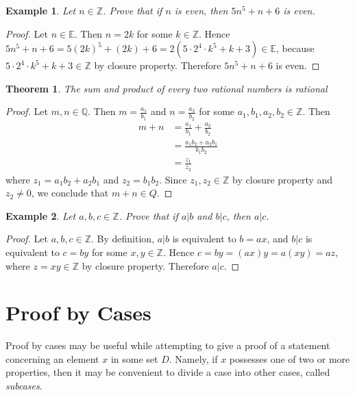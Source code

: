 \documentclass[10pt,reqno]{book}
\theoremstyle{plain}
\newtheorem{theorem}{Theorem}[section]
\newtheorem{example}{Example}
\def\Z{\mathbb{Z}}
\def\Q{\mathbb{Q}}
\def\E{\mathbb{E}}
\begin{document}
	\begin{example}
		Let $ n \in \Z $. Prove that if $ n $ is even, then $ 5n^5 + n + 6 $ is even.
	\end{example}
	
	\begin{proof}
		Let $ n \in \E $. Then $ n = 2k $ for some $ k \in \Z $. Hence $ 5n^5 + n + 6 = 5(2k)^5 + (2k) + 6 = 2(5 \cdot 2^4 \cdot k^5 + k + 3) \in \E $, because $ 5 \cdot 2^4 \cdot k^5 + k + 3 \in \Z $ by closure property. Therefore $ 5n^5 + n + 6 $ is even.
	\end{proof}
	
	\begin{theorem}
		The sum and product of every two rational numbers is rational
	\end{theorem}
	
	\begin{proof}
		Let $ m,n \in \Q $. Then $ m = \frac{a_1}{b_1} $ and $ n = \frac{a_2}{b_2} $ for some $ a_1,b_1,a_2,b_2 \in \Z $. Then
			\begin{align*}
				m + n &= \frac{a_1}{b_1} + \frac{a_2}{b_2}\\
					  &= \frac{a_1 b_2 + a_2 b_1}{b_1 b_2}\\
					  &= \frac{z_1}{z_2}
			\end{align*}
		where $ z_1 = a_1 b_2 + a_2 b_1 $ and $ z_2 = b_1 b_2 $. Since $ z_1, z_2 \in \Z $ by closure property and $ z_2 \neq 0 $, we conclude that $ m + n \in Q $.
	\end{proof}
	
	\begin{example}
		Let $ a,b,c \in \Z $. Prove that if $ a|b $ and $ b|c $, then $ a|c $.
	\end{example}
	
	\begin{proof}
		Let $ a,b,c \in \Z $. By definition, $ a|b $ is equivalent to $ b = ax $, and $ b|c $ is equivalent to $ c = by $ for some $ x,y \in \Z $. Hence $ c = by = (ax) y = a(xy) = az $, where $ z = xy \in \Z $ by closure property. Therefore $ a|c $.
	\end{proof}

	\section*{Proof by Cases}
	
	Proof by cases may be useful while attempting to give a proof of a statement concerning an element $ x $ in some set $ D $. Namely, if $ x $ possesses one of two or more properties, then it may be convenient to divide a case into other cases, called \textit{subcases}.
	
\end{document}
